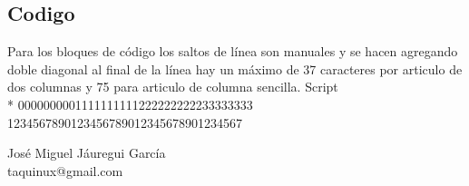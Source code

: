 \begin{multicols}{2}
\section*{Codigo}
Para los bloques de código los saltos de línea son manuales y se hacen agregando
doble diagonal al final de la línea hay un máximo de 37 caracteres por articulo
de dos columnas y 75 para articulo de columna sencilla.
\Code
   {Script}
   {
   \\*
   0000000001111111111222222222233333333\\
   1234567890123456789012345678901234567\\
   }

\begin{flushright}
José Miguel Jáuregui García \\
taquinux@gmail.com
\end{flushright}


\end{multicols}
